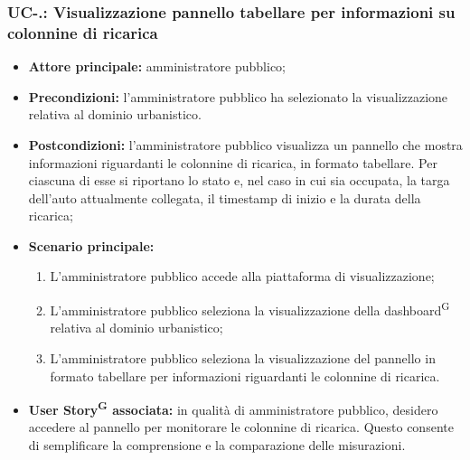 \documentclass[8pt]{article}
\newcommand{\glossterm}[1]{#1\textsuperscript{G}} %
\begin{document}
\subsubsection*{UC-\theuc .\speconenumber: Visualizzazione pannello tabellare per informazioni su colonnine di ricarica}
\begin{itemize}
    \item \textbf{Attore principale:} amministratore pubblico;
    \item \textbf{Precondizioni:} l'amministratore pubblico ha selezionato la visualizzazione relativa al dominio urbanistico.
    \item \textbf{Postcondizioni:} l'amministratore pubblico visualizza un pannello che mostra informazioni riguardanti le colonnine di ricarica, in formato tabellare. Per ciascuna di esse si riportano lo stato e, nel caso in cui sia occupata, la targa dell'auto attualmente collegata, il timestamp di inizio e la durata della ricarica;
    \item \textbf{Scenario principale:} 
    \begin{enumerate}
    \item L'amministratore pubblico accede alla piattaforma di visualizzazione;
    \item L'amministratore pubblico seleziona la visualizzazione della \glossterm{dashboard} relativa al dominio urbanistico;
    \item L'amministratore pubblico seleziona la visualizzazione del pannello in formato tabellare per informazioni riguardanti le colonnine di ricarica.
    \end{enumerate}
    \item \textbf{\glossterm{User Story} associata:} in qualità di amministratore pubblico, desidero accedere al pannello per monitorare le colonnine di ricarica. Questo consente di semplificare la comprensione e la comparazione delle misurazioni.
\end{itemize}
\end{document}
